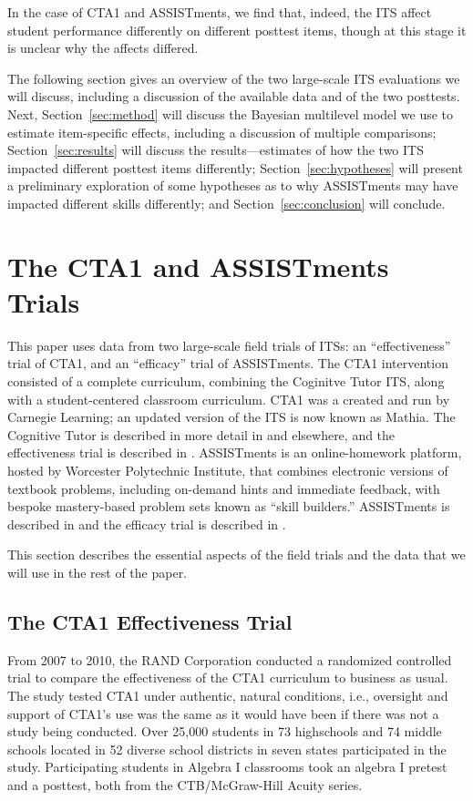 \documentclass{edm_article}
\begin{document}
In the case of CTA1 and ASSISTments, we find that, indeed, the ITS
affect student performance differently on different posttest items,
though at this stage it is unclear why the affects differed. 

The following section gives an overview of the two large-scale ITS
evaluations we will discuss, including a discussion of the available
data and of the two posttests. Next, Section~\ref{sec:method} will
discuss the Bayesian multilevel model we use to estimate item-specific
effects, including a discussion of multiple comparisons;
Section~\ref{sec:results} will discuss the results---estimates of how
the two ITS impacted different posttest items differently;
Section~\ref{sec:hypotheses} will present a preliminary exploration of
some hypotheses as to why ASSISTments may have impacted different
skills differently; and Section~\ref{sec:conclusion} will conclude.


\section{The CTA1 and ASSISTments Trials}
This paper uses data from two large-scale field trials of ITSs: an
``effectiveness'' trial of CTA1, and an ``efficacy'' trial of
ASSISTments. The CTA1 intervention consisted of a complete curriculum,
combining the Coginitve Tutor ITS, along with a student-centered
classroom curriculum. CTA1 was a created and run by Carnegie Learning;
an updated version of the ITS is now known as Mathia. The Cognitive
Tutor is described in more detail in \cite{anderson1995cognitive} and
elsewhere, and the effectiveness trial is described in \cite{pane2014effectiveness}.
ASSISTments is an online-homework platform, hosted by Worcester
Polytechnic Institute, that combines electronic versions of textbook
problems, including on-demand hints and immediate feedback, with
bespoke mastery-based problem sets known as ``skill builders.''
ASSISTments is described in \cite{heffernan2014assistments} and the
efficacy trial is described in \cite{roschelle2016online}.

This section describes the essential aspects of the field trials and
the data that we will use in the rest of the paper. 

\subsection{The CTA1 Effectiveness Trial}
From 2007 to 2010, the RAND Corporation conducted a randomized
controlled trial to compare the effectiveness of the CTA1 curriculum
to business as usual. The study tested CTA1 under authentic, natural
conditions, i.e., oversight and support of CTA1's use was the same as
it would have been if there was not a study being conducted. Over
25,000 students in 73 highschools and 74 middle schools located in 52
diverse school districts in seven states participated in the
study. Participating students in Algebra I classrooms took an algebra
I pretest and a posttest, both from the CTB/McGraw-Hill Acuity series. 
\end{document}
